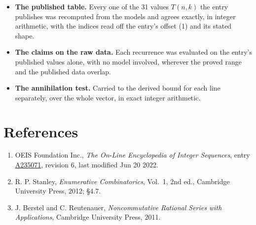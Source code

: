 \documentclass[11pt]{article}
\theoremstyle{definition}
\begin{document}
\begin{itemize}

\item {\bfseries The published table.} Every one of the 31 values $T(n,k)$ the entry publishes was recomputed from the models and agrees exactly, in integer arithmetic, with the indices read off the entry's offset (1) and its stated shape.

\item {\bfseries The claims on the raw data.} Each recurrence was evaluated on the entry's published values alone, with no model involved, wherever the proved range and the published data overlap.

\item {\bfseries The annihilation test.} Carried to the derived bound for each line separately, over the whole vector, in exact integer arithmetic.

\end{itemize}

\section{References}

\begin{enumerate}

\item OEIS Foundation Inc., \emph{The On-Line Encyclopedia of Integer Sequences}, entry \href{https://oeis.org/A235071}{A235071}, revision 6, last modified Jun 20 2022.

\item R. P. Stanley, \emph{Enumerative Combinatorics}, Vol.~1, 2nd ed., Cambridge University Press, 2012; \S4.7.

\item J. Berstel and C. Reutenauer, \emph{Noncommutative Rational Series with Applications}, Cambridge University Press, 2011.

\end{enumerate}
\end{document}
